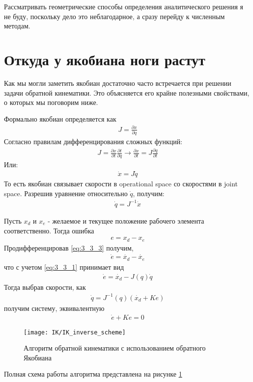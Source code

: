 Рассматривать геометрические способы определения аналитического решения я не буду, поскольку дело это неблагодарное, а сразу перейду к численным методам.

\section{Откуда у якобиана ноги растут} \label{sect:3_3}
Как мы могли заметить якобиан достаточно часто встречается при решении задачи обратной кинематики. Это объясняется его крайне полезными свойствами, о которых мы поговорим ниже.

Формально якобиан определяется как
\begin{align*}
	J = \frac{\partial x}{\partial q}
\end{align*} 
Согласно правилам дифференцирования сложных функций:
\begin{align*}
	J = \frac{\partial x}{\partial t} \frac{\partial t}{\partial q}		\rightarrow		\frac{\partial x}{\partial t} = J\frac{\partial q}{\partial t}
\end{align*}
Или:
\begin{align} \label{eq:3_3_1}
	\dot{x} = J\dot{q}
\end{align}
То есть якобиан связывает скорости в operational space со скоростями в joint space. Разрешив уравнение относительно $\dot{q}$, получим:
\begin{align*}
	\dot{q} = J^{-1}\dot{x}
\end{align*}

Пусть $x_{d}$ и $x_{e}$ - желаемое и текущее положение рабочего элемента соответственно. Тогда ошибка 
\begin{align} \label{eq:3_3_3}
e = x_{d} - x_{e}
\end{align}
Продифференцировав \ref{eq:3_3_3} получим,
\begin{align*}
	\dot{e} = \dot{x_{d}} - \dot{x_{e}}
\end{align*}
что с учетом \ref{eq:3_3_1} принимает вид
\begin{align*}
	\dot{e} = \dot{x_{d}} - J(q)\dot{q}
\end{align*}
Тогда выбрав скорости, как
\begin{align} \label{eq:3_3_4}
	\dot{q} = J^{-1}(q)(\dot{x_{d}} + Ke)
\end{align}
получим систему, эквивалентную
\begin{align} \label{eq:3_3_5}
	\dot{e} + Ke = 0
\end{align}
\begin{figure}[ht]
	\centering
	\texttt{[image: IK/IK\_inverse\_scheme]}
	\caption{Алгоритм обратной кинематики с использованием обратного Якобиана}
	\label{fig:ik_inverse_sheme}
\end{figure}
Полная схема работы алгоритма представлена на рисунке \ref{fig:ik_inverse_sheme}

